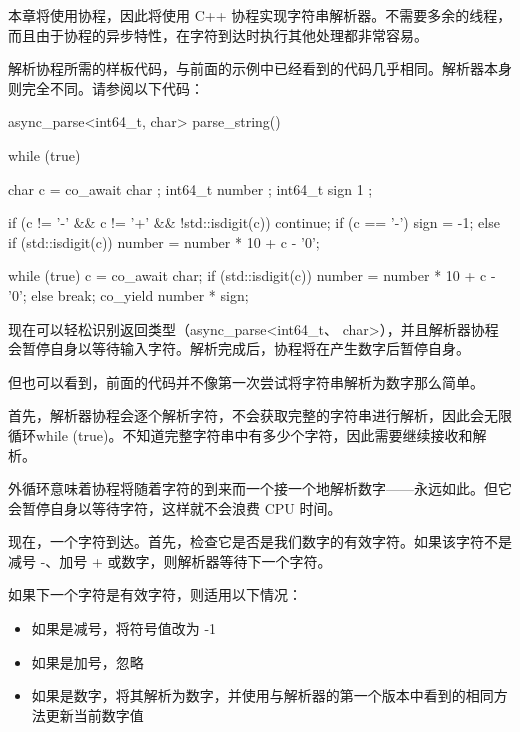 
本章将使用协程，因此将使用 C++ 协程实现字符串解析器。不需要多余的线程，而且由于协程的异步特性，在字符到达时执行其他处理都非常容易。

解析协程所需的样板代码，与前面的示例中已经看到的代码几乎相同。解析器本身则完全不同。请参阅以下代码：

\begin{cpp}
async_parse<int64_t, char> parse_string() {
    while (true) {
        char c = co_await char{ };
        int64_t number { };
        int64_t sign { 1 };

        if (c != '-' && c != '+' && !std::isdigit(c)) {
            continue;
        }
        if (c == '-') {
            sign = -1;
        }
        else if (std::isdigit(c)) {
            number = number * 10 + c - '0';
        }

        while (true) {
            c = co_await char{};
            if (std::isdigit(c)) {
                number = number * 10 + c - '0';
            }
            else {
                break;
            }
        }
        co_yield number * sign;
    }
}
\end{cpp}

现在可以轻松识别返回类型（async\_parse<int64\_t、 char>），并且解析器协程会暂停自身以等待输入字符。解析完成后，协程将在产生数字后暂停自身。

但也可以看到，前面的代码并不像第一次尝试将字符串解析为数字那么简单。

首先，解析器协程会逐个解析字符，不会获取完整的字符串进行解析，因此会无限循环while (true)。不知道完整字符串中有多少个字符，因此需要继续接收和解析。

外循环意味着协程将随着字符的到来而一个接一个地解析数字——永远如此。但它会暂停自身以等待字符，这样就不会浪费 CPU 时间。

现在，一个字符到达。首先，检查它是否是我们数字的有效字符。如果该字符不是减号 -、加号 + 或数字，则解析器等待下一个字符。

如果下一个字符是有效字符，则适用以下情况：

\begin{itemize}
\item
如果是减号，将符号值改为 -1

\item
如果是加号，忽略

\item
如果是数字，将其解析为数字，并使用与解析器的第一个版本中看到的相同方法更新当前数字值
\end{itemize}

